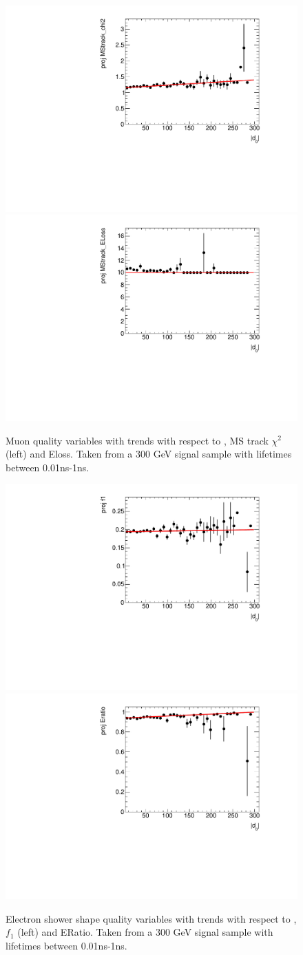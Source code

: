 \begin{figure}[htbp]
\centering
\includegraphics[width=.48\textwidth]{figures/disp_systs/m_signal_MStrack_chi2_profile.pdf}
\includegraphics[width=.48\textwidth]{figures/disp_systs/m_signal_MStrack_ELoss_profile.pdf}
\caption{Muon quality variables with trends with respect to \absdz, \ac{MS} track $\chi^{2}$ (left) and Eloss. Taken from a 300 GeV signal sample with lifetimes between 0.01ns-1ns.}
\label{fig:profs_mu}
\end{figure}

\begin{figure}[htbp]
\centering
\includegraphics[width=.48\textwidth]{figures/disp_systs/e_signal_f1_profile.pdf}
\includegraphics[width=.48\textwidth]{figures/disp_systs/e_signal_Eratio_profile.pdf}
\caption{Electron shower shape quality variables with trends with respect to \absdz, $f_{1}$ (left) and ERatio. Taken from a 300 GeV signal sample with lifetimes between 0.01ns-1ns.}
\label{fig:profs_el}
\end{figure}


